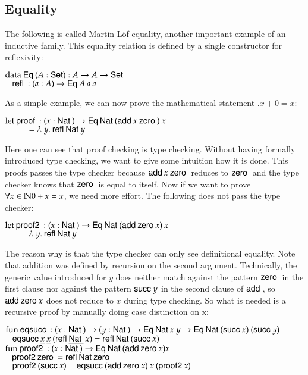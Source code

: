 \subsection{Equality}
The following is called Martin-L\"of equality, another important example of an inductive family.
This equality relation is defined by a single constructor for reflexivity:
\begin{bsp}
$\mathrm{data}\: \mathsf{Eq}\: ( A : \mathsf{Set} ) : A \rightarrow A \rightarrow \mathsf{Set} $ \\
$\hspace*{3mm} \mathsf{refl}\: : ( a : A ) \rightarrow{\mathsf{Eq}\:A \: a \: a}$
\end{bsp}
As a simple example, we can now prove the mathematical statement $ . x  + 0 = x $:
\begin{bsp}
$ \mathrm{let}\: \mathsf{proof}\: : ( x : \mathsf{Nat}\: ) \rightarrow{\mathsf{Eq}\:\mathsf{Nat}\:(\mathsf{add}\:x \: \mathsf{zero}\:)\: x} $ \\ 
$ \spcx = \lam{y}\refl \Nat y$ 
\end{bsp}
Here one can see that proof checking is type checking.
Without having formally introduced type checking, we want to give some intuition how it is done.
This proofs passes the type checker because $\mathsf{add}\: x \: \mathsf{zero}\:$ reduces to $\mathsf{zero}\:$ and the type checker knows that $\mathsf{zero}\:$ is equal to itself.
Now if we want to prove $ \forall x \in \mathbb{N} 0 +  x = x $, we need more effort.
The following does not pass the type checker:
\begin{bsp}
$ \mathrm{let}\: \mathsf{proof2}\: : ( x : \mathsf{Nat}\: ) \rightarrow{\mathsf{Eq}\:\mathsf{Nat}\:(\mathsf{add}\:\mathsf{zero}\:x)\: x} $ \\ 
$ \spcx \lam{y} \refl \Nat y$ 
\end{bsp}
The reason why is that the type checker can only see definitional equality.
Note that addition was defined by recursion on the second argument.
Technically, the generic value introduced for $y$ does neither match against the pattern $\mathsf{zero}\:$ in the first clause
nor against the pattern $\mathsf{succ}\: y$ in the second clause of $\mathsf{add}\:$, so $\mathsf{add}\: \mathsf{zero}\: x$ does not reduce to $x$ during type checking.
So what is needed is a recursive proof by manually doing case distinction on x:
\begin{bsp}
$\mathrm{fun}\: \mathsf{eqsucc}\: : ( x : \mathsf{Nat}\: ) \rightarrow( y : \mathsf{Nat}\: ) \rightarrow \mathsf{Eq}\: \mathsf{Nat}\: x \: y \rightarrow \mathsf{Eq}\: \mathsf{Nat}\: (\mathsf{succ}\: x) \: (\mathsf{succ}\: y)$ \\
$\hspace*{3mm} \mathsf{eqsucc}\: \underline{x} \: \underline{x} \: (\mathsf{refl}\: \underline{\mathsf{Nat}\:} \: x) = \mathsf{refl}\: \mathsf{Nat}\: (\mathsf{succ}\: x)$
\vs\\
$\mathrm{fun}\: \mathsf{proof2}\: : ( x : \mathsf{Nat}\: ) \rightarrow \mathsf{Eq}\: \mathsf{Nat}\: (\mathsf{add}\: \mathsf{zero}\: x) x$\\
$\hspace*{3mm} \mathsf{proof2}\: \mathsf{zero}\: = \mathsf{refl}\: \mathsf{Nat}\: \mathsf{zero}\:$\\
$\hspace*{3mm} \mathsf{proof2}\: (\mathsf{succ}\: x) = \mathsf{eqsucc}\: (\mathsf{add}\: \mathsf{zero}\: x)\: x \: (\mathsf{proof2}\: x)$
\end{bsp}

